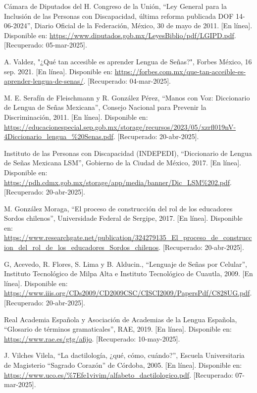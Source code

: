 \begin{thebibliography}{200}
    Cámara de Diputados del H. Congreso de la Unión, “Ley General para la Inclusión de las Personas con Discapacidad, última reforma publicada DOF 14-06-2024”, Diario Oficial de la Federación, México, 30 de mayo de 2011. [En línea]. Disponible en: \url{https://www.diputados.gob.mx/LeyesBiblio/pdf/LGIPD.pdf}. [Recuperado: 05-mar-2025].

    A. Valdez, "¿Qué tan accesible es aprender Lengua de Señas?", Forbes México, 16 sep. 2021. [En línea]. Disponible en: \url{https://forbes.com.mx/que-tan-acceible-es-aprender-lengua-de-senas/}. [Recuperado: 04-mar-2025].

    M. E. Serafín de Fleischmann y R. González Pérez, “Manos con Voz: Diccionario de Lengua de Señas Mexicana”, Consejo Nacional para Prevenir la Discriminación, 2011. [En línea]. Disponible en: \url{https://educacionespecial.sep.gob.mx/storage/recursos/2023/05/xzrfl019nV-4Diccionario_lengua_%20Senas.pdf}. [Recuperado: 20-abr-2025].

    Instituto de las Personas con Discapacidad (INDEPEDI), “Diccionario de Lengua de Señas Mexicana LSM”, Gobierno de la Ciudad de México, 2017. [En línea]. Disponible en: \url{https://pdh.cdmx.gob.mx/storage/app/media/banner/Dic_LSM%202.pdf}. [Recuperado: 20-abr-2025].

    M. González Moraga, “El proceso de construcción del rol de los educadores Sordos chilenos”, Universidade Federal de Sergipe, 2017. [En línea]. Disponible en: \url{https://www.researchgate.net/publication/324279135_El_proceso_de_construccion_del_rol_de_los_educadores_Sordos_chilenos}. [Recuperado: 20-abr-2025].

    G, Acevedo, R. Flores, S. Lima y B. Alducin., “Lenguaje de Señas por Celular”, Instituto Tecnológico de Milpa Alta e Instituto Tecnológico de Cuautla, 2009. [En línea]. Disponible en: \url{https://www.iiis.org/CDs2009/CD2009CSC/CISCI2009/PapersPdf/C828UG.pdf}. [Recuperado: 20-abr-2025].

    Real Academia Española y Asociación de Academias de la Lengua Española, “Glosario de términos gramaticales”, RAE, 2019. [En línea]. Disponible en: \url{https://www.rae.es/gtg/afijo}. [Recuperado: 10-may-2025].

    J. Vilches Vilela, “La dactilología, ¿qué, cómo, cuándo?”, Escuela Universitaria de Magisterio “Sagrado Corazón” de Córdoba, 2005. [En línea]. Disponible en: \url{https://www.uco.es/%7Efe1vivim/alfabeto_dactilologico.pdf}. [Recuperado: 07-mar-2025].


\end{thebibliography}
